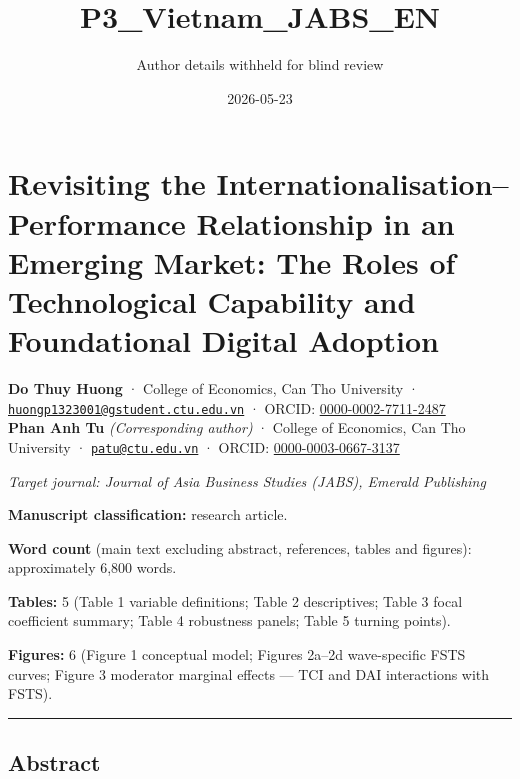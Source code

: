 \documentclass[12pt,a4paper]{article}
\title{P3\_Vietnam\_JABS\_EN}
\author{Author details withheld for blind review}
\date{2026-05-23}
\begin{document}
\maketitle

\hypertarget{revisiting-the-internationalisationperformance-relationship-in-an-emerging-market-the-roles-of-technological-capability-and-foundational-digital-adoption}{%
\section{Revisiting the Internationalisation--Performance Relationship
in an Emerging Market: The Roles of Technological Capability and
Foundational Digital
Adoption}\label{revisiting-the-internationalisationperformance-relationship-in-an-emerging-market-the-roles-of-technological-capability-and-foundational-digital-adoption}}

\textbf{Do Thuy Huong} · College of Economics, Can Tho University ·
\href{mailto:huongp1323001@gstudent.ctu.edu.vn}{\nolinkurl{huongp1323001@gstudent.ctu.edu.vn}}
· ORCID:
\href{https://orcid.org/0000-0002-7711-2487}{0000-0002-7711-2487}\\
\textbf{Phan Anh Tu} \emph{(Corresponding author)} · College of
Economics, Can Tho University ·
\href{mailto:patu@ctu.edu.vn}{\nolinkurl{patu@ctu.edu.vn}} · ORCID:
\href{https://orcid.org/0000-0003-0667-3137}{0000-0003-0667-3137}

\emph{Target journal: Journal of Asia Business Studies (JABS), Emerald
Publishing}

\textbf{Manuscript classification:} research article.

\textbf{Word count} (main text excluding abstract, references, tables
and figures): approximately 6,800 words.

\textbf{Tables:} 5 (Table 1 variable definitions; Table 2 descriptives;
Table 3 focal coefficient summary; Table 4 robustness panels; Table 5
turning points).

\textbf{Figures:} 6 (Figure 1 conceptual model; Figures 2a--2d
wave-specific FSTS curves; Figure 3 moderator marginal effects --- TCI
and DAI interactions with FSTS).

\begin{center}\rule{0.5\linewidth}{0.5pt}\end{center}

\hypertarget{abstract}{%
\subsection{Abstract}\label{abstract}}
\end{document}

